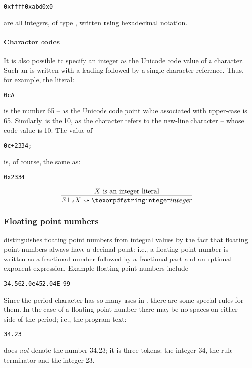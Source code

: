 \begin{alltt}
0xffff 0xabd 0x0
\end{alltt}
are all integers, of type , written using hexadecimal notation.

\paragraph{Character codes}
It is also possible to specify an integer as the Unicode code value of a character. Such an  is written with a leading  followed by a single character reference. Thus, for example, the literal:
\begin{alltt}
0cA
\end{alltt}
is the number 65 -- as the Unicode code point value associated with upper-case  is 65. Similarly,  is the  10, as the character  refers to the new-line character -- whose code value is 10. The value of
\begin{alltt}
0c\bsl{}+2334;
\end{alltt}
is, of course, the same as:
\begin{alltt}
0x2334
\end{alltt}

\begin{equation}
\frac{X \mbox{ is an integer literal}}
{\typeprd{E}{X}{\q{integer}}}
\end{equation}

\subsubsection{Floating point numbers}
\go distinguishes floating point numbers from integral values by the fact that floating point numbers always have a decimal point: i.e., a floating point number is written as a fractional number followed by a fractional part and an optional exponent expression. Example floating point numbers include:
\begin{alltt}
34.56 2.0e45 2.04E-99
\end{alltt}
Since the period character has so many uses in \go, there are some special rules for them. In the case of a floating point number there may be no spaces on either side of the period; i.e., the program text:
\begin{alltt}
34 . 23
\end{alltt}
does \emph{not} denote the number 34.23; it is three tokens: the integer 34, the rule terminator \q{\dotspace} and the integer 23.

